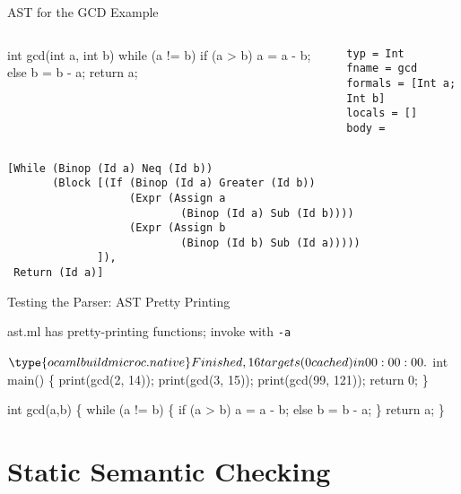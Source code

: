 \documentclass{plt}
\begin{document}
\begin{frame}[fragile=singleslide,t]{AST for the GCD Example}

\begin{columns}
\begin{column}{0.5\textwidth}
\begin{C}
int gcd(int a, int b) {
  while (a != b)
    if (a > b) a = a - b;
    else b = b - a;
  return a;
}
\end{C}
\end{column}
\begin{column}{0.5\textwidth}
\begin{verbatim}
typ = Int
fname = gcd
formals = [Int a; Int b]
locals = []
body = 
\end{verbatim}
\end{column}
\end{columns}

\begin{verbatim}
[While (Binop (Id a) Neq (Id b))
       (Block [(If (Binop (Id a) Greater (Id b))
                   (Expr (Assign a
                           (Binop (Id a) Sub (Id b))))
                   (Expr (Assign b
                           (Binop (Id b) Sub (Id a)))))
              ]),
 Return (Id a)]
\end{verbatim}

\end{frame}

\begin{frame}[fragile=singleslide]{Testing the Parser: AST Pretty Printing}

ast.ml has pretty-printing functions; invoke with \texttt{-a}

\begin{interactive}
$ \type{ocamlbuild microc.native}
Finished, 16 targets (0 cached) in 00:00:00.
$ 
int main()
\{
print(gcd(2, 14));
print(gcd(3, 15));
print(gcd(99, 121));
return 0;
\}

int gcd(a,b)
\{
while (a != b) \{
if (a > b)
a = a - b;
else
b = b - a;
\}
return a;
\}
\end{interactive}

\end{frame}

\part{Static Semantic Checking}

\end{document}
